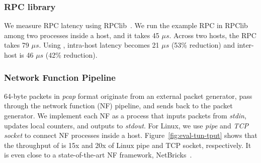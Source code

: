 



\subsubsection{RPC library}
\quad

We measure RPC latency using RPClib~\cite{rpclib}.
We run the example RPC in RPClib among two processes inside a host, and it takes 45 $\mu s$. Across two hosts, the RPC takes 79 $\mu s$.
Using \sys{}, intra-host latency becomes 21 $\mu s$ (53\% reduction) and inter-host is 46 $\mu s$ (42\% reduction).


\subsubsection{Network Function Pipeline}
\quad

64-byte packets in \emph{pcap} format originate from an external packet generator, pass through the network function (NF) pipeline, and sends back to the packet generator.
We implement each NF as a process that inputs packets from \emph{stdin}, updates local counters, and outputs to \emph{stdout}.
For Linux, we use \emph{pipe} and \emph{TCP socket} to connect NF processes inside a host.
Figure~\ref{fig:eval-tun-tput} shows that the throughput of \sys{} is 15x and 20x of Linux pipe and TCP socket, respectively.
It is even close to a state-of-the-art NF framework, NetBricks~\cite{panda2016netbricks}.


